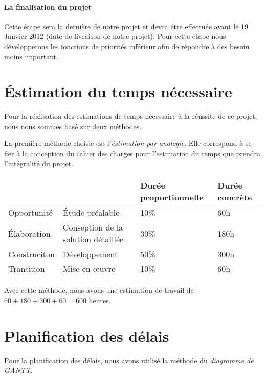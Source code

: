 \paragraph{La finalisation du projet}

Cette étape sera la dernière de notre projet et devra être effectuée avant le 19 Janvier 2012 (date de livraison de notre projet).
Pour cette étape nous développerons les fonctions de priorités inférieur afin de répondre à des besoin moins important. 

\section{Éstimation du temps nécessaire}
Pour la réalisation des estimations de temps nécessaire à la réussite de ce projet,
nous nous sommes basé sur deux méthodes. 

La première méthode choisie est l'\emph{éstimation par analogie}.
Elle correspond à se fier à la conception du cahier des charges pour l'estimation du temps que prendra l'intégralité du projet. 

\begin{tabular}{|l l|l|l|}
\hline
&& Durée proportionnelle & Durée concrète \\
\hline
Opportunité & Étude préalable & 10\% & 60h \\
\hline
Élaboration & Conseption de la solution détaillée & 30\% & 180h \\
\hline
Construciton & Développement & 50\% & 300h \\
\hline
Transition & Mise en œuvre & 10\% & 60h \\
\hline
\end{tabular}

Avec cette méthode, nous avons une estimation de travail de $60 + 180 + 300 + 60 = 600$ heures. 

\section{Planification des délais}

Pour la planification des délais, nous avons utilisé la méthode du \emph{diagramme de GANTT}.
